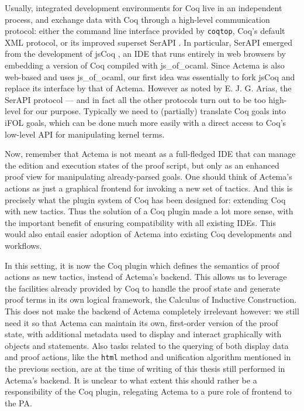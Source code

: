Usually, integrated development environments for Coq live in an independent
process, and exchange data with Coq through a high-level communication protocol:
either the command line interface provided by \texttt{coqtop}, Coq's default XML
protocol, or its improved superset SerAPI . In
particular, SerAPI emerged from the development of jsCoq
, an IDE that runs entirely in web browsers by
embedding a version of Coq compiled with js\_of\_ocaml. Since Actema is also
web-based and uses js\_of\_ocaml, our first idea was essentially to fork jsCoq
and replace its interface by that of Actema. However as noted by E. J. G.
Arias, the SerAPI protocol --- and in fact
all the other protocols turn out to be too high-level for our purpose. Typically
we need to (partially) translate Coq goals into iFOL goals, which can be done
much more easily with a direct access to Coq's low-level API for manipulating
kernel terms.

Now, remember that Actema is not meant as a full-fledged IDE that can manage the
edition and execution states of the proof script, but only as an enhanced proof
view for manipulating already-parsed goals. One should think of Actema's actions
as just a graphical frontend for invoking a new set of tactics. And this is
precisely what the plugin system of Coq has been designed for: extending Coq
with new tactics. Thus the solution of a Coq plugin made a lot more sense, with
the important benefit of ensuring compatibility with all existing IDEs. This
would also entail easier adoption of Actema into existing Coq developments and
workflows.

In this setting, it is now the Coq plugin which defines the semantics of proof
actions as new tactics, instead of Actema's backend. This allows us to leverage
the facilities already provided by Coq to handle the proof state and generate
proof terms in its own logical framework, the Calculus of Inductive
Construction. This does not make the backend of Actema completely irrelevant
however: we still need it so that Actema can maintain its own, first-order
version of the proof state, with additional metadata used to display and
interact graphically with objects and statements. Also tasks related to the
querying of both display data and proof actions, like the \texttt{html} method
and unification algorithm mentioned in the previous section, are at the time of
writing of this thesis still performed in Actema's backend. It is unclear to
what extent this should rather be a responsibility of the Coq plugin, relegating
Actema to a pure role of frontend to the PA.

